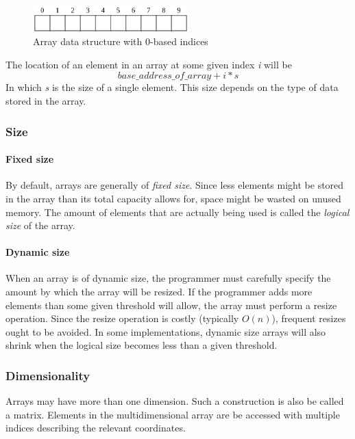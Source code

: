 \documentclass{article}
\begin{document}
\begin{figure}[H]
  \centering
  \includegraphics[width=6cm]{array}
  \caption{Array data structure with 0-based indices}
\end{figure}

The location of an element in an array at some given index {\em i} will be
\[base\_address\_of\_array + i * s\]
In which {\em s} is the size of a single element. This size depends on the type of data stored in the array.

\subsubsection{Size}
\paragraph{Fixed size}
By default, arrays are generally of {\em fixed size}. Since less elements might be stored in the array than its total
capacity allows for, space might be wasted on unused memory. The amount of elements that are actually being used is
called the {\em logical size} of the array.

\paragraph{Dynamic size}
When an array is of dynamic size, the programmer must carefully specify the amount by which the array will be resized.
If the programmer adds more elements than some given threshold will allow, the array must perform a resize operation.
Since the resize operation is costly (typically \(O(n)\)), frequent resizes ought to be avoided. In some implementations,
dynamic size arrays will also shrink when the logical size becomes less than a given threshold.

\subsubsection{Dimensionality}
Arrays may have more than one dimension. Such a construction is also be called a matrix. Elements in the multidimensional
array are be accessed with multiple indices describing the relevant coordinates.


\end{document}
